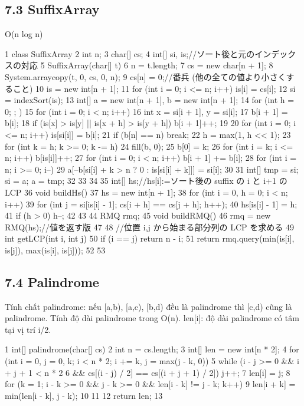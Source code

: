 \documentclass[11pt]{article}
\begin{document}
\subsection{7.3 SuﬃxArray}
\begin{NoteBlock}
O(n log n)
\end{NoteBlock}
\begin{Code}
1 class SuffixArray {
2 int n;
3 char[] cs;
4 int[] si, is;//ソート後と元のインデックスの対応
5 SuffixArray(char[] t) {
6 n = t.length;
7 cs = new char[n + 1];
8 System.arraycopy(t, 0, cs, 0, n);
9 cs[n] = 0;//番兵 (他の全ての値より小さくすること)
10 is = new int[n + 1];
11 for (int i = 0; i <= n; i++) is[i] = cs[i];
12 si = indexSort(is);
13 int[] a = new int[n + 1], b = new int[n + 1];
14 for (int h = 0; ; ) {
15 for (int i = 0; i < n; i++) {
16 int x = si[i + 1], y = si[i];
17 b[i + 1] = b[i];
18 if (is[x] > is[y] || is[x + h] > is[y + h]) b[i + 1]++;
19 }
20 for (int i = 0; i <= n; i++) is[si[i]] = b[i];
21 if (b[n] == n) break;
22 h = max(1, h << 1);
23 for (int k = h; k >= 0; k -= h) {
24 fill(b, 0);
25 b[0] = k;
26 for (int i = k; i <= n; i++) b[is[i]]++;
27 for (int i = 0; i < n; i++) b[i + 1] += b[i];
28 for (int i = n; i >= 0; i--) {
29 a[--b[si[i] + k > n ? 0 : is[si[i] + k]]] = si[i];
30 }
31 int[] tmp = si; si = a; a = tmp;
32 }
33 }
34 }
35 int[] hs;//hs[i]:=ソート後の suffix の i と i+1 の LCP
36 void buildHs() {
37 hs = new int[n + 1];
38 for (int i = 0, h = 0; i < n; i++) {
39 for (int j = si[is[i] - 1]; cs[i + h] == cs[j + h]; h++);
40 hs[is[i] - 1] = h;
41 if (h > 0) h--;
42 }
43 }
44 RMQ rmq;
45 void buildRMQ() {
46 rmq = new RMQ(hs);//値を返す版
47 }
48 //位置 i,j から始まる部分列の LCP を求める
49 int getLCP(int i, int j) {
50 if (i == j) return n - i;
51 return rmq.query(min(is[i], is[j]), max(is[i], is[j]));
52 }
53 }
\end{Code}
\subsection{7.4 Palindrome}
\begin{NoteBlock}
Tính chất palindrome: nếu [a,b), [a,c), [b,d) đều là palindrome thì [c,d) cũng là palindrome.
Tính độ dài palindrome trong O(n).
len[i]: độ dài palindrome có tâm tại vị trí i/2.
\end{NoteBlock}
\begin{Code}
1 int[] palindrome(char[] cs) {
2 int n = cs.length;
3 int[] len = new int[n * 2];
4 for (int i = 0, j = 0, k; i < n * 2; i += k, j = max(j - k, 0)) {
5 while (i - j >= 0 && i + j + 1 < n * 2
6 && cs[(i - j) / 2] == cs[(i + j + 1) / 2]) j++;
7 len[i] = j;
8 for (k = 1; i - k >= 0 && j - k >= 0 && len[i - k] != j - k; k++) {
9 len[i + k] = min(len[i - k], j - k);
10 }
11 }
12 return len;
13 }
\end{Code}
\end{document}

